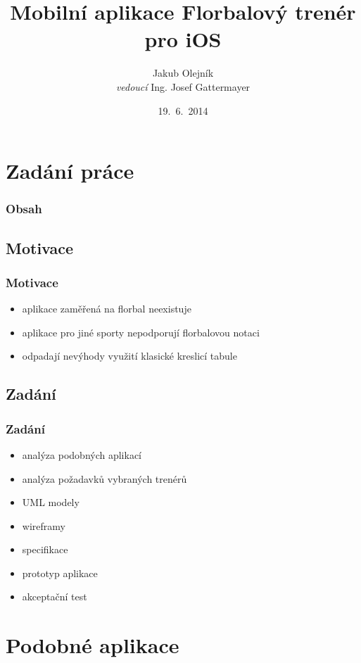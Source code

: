 \documentclass{beamer}
\title{Mobilní aplikace Florbalový trenér pro iOS}
\author{Jakub Olejník \\
\emph{vedoucí} Ing. Josef Gattermayer}
\institute[ČVUT FIT]{Katedra softwarového inženýrství\\
Fakulta informačních technologií\\
ČVUT v Praze}
\date{19.~6.~2014}
\begin{document}
\begin{frame}
  \titlepage
\end{frame}

\section{Zadání práce}

\begin{frame}
  \frametitle{Obsah}
  \tableofcontents[currentsection]
\end{frame}

\subsection{Motivace}
\begin{frame}
\frametitle{Motivace}

\begin{itemize}
  \item aplikace zaměřená na florbal neexistuje
  \item aplikace pro jiné sporty nepodporují florbalovou notaci
  \item odpadají nevýhody využití klasické kreslicí tabule
\end{itemize}

\end{frame}

\subsection{Zadání}
\begin{frame}
\frametitle{Zadání}

\begin{itemize}
  \item analýza podobných aplikací
  \item analýza požadavků vybraných trenérů
  \item UML modely
  \item wireframy
  \item specifikace
  \item prototyp aplikace
  \item akceptační test
\end{itemize}

\end{frame}

\section{Podobné aplikace}
\end{document}
